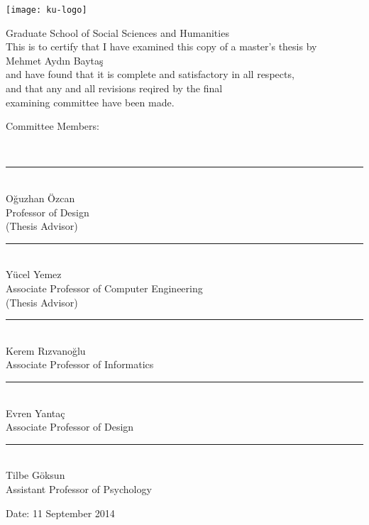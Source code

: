 \begin{center}

\texttt{[image: ku-logo]}

Graduate School of Social Sciences and Humanities\\[5mm]

This is to certify that I have examined this copy of a master's thesis by\\[2mm]

Mehmet Aydın Baytaş\\[2mm]

and have found that it is complete and satisfactory in all respects,\\
and that any and all revisions reqired by the final\\
examining committee have been made.\\[1cm]

\end{center}

Committee Members:

\begin{center}

~\\[5mm]
\rule{80mm}{.1pt}\\
Oğuzhan Özcan\\
Professor of Design\\
(Thesis Advisor)\\[15mm]

\rule{80mm}{.1pt}\\
Yücel Yemez\\
Associate Professor of Computer Engineering\\
(Thesis Advisor)\\[15mm]

\rule{80mm}{.1pt}\\
Kerem Rızvanoğlu\\
Associate Professor of Informatics\\[15mm]

\rule{80mm}{.1pt}\\
Evren Yantaç\\
Associate Professor of Design\\[15mm]

\rule{80mm}{.1pt}\\
Tilbe Göksun\\
Assistant Professor of Psychology\\[1cm]

\end{center}

Date: 11 September 2014
